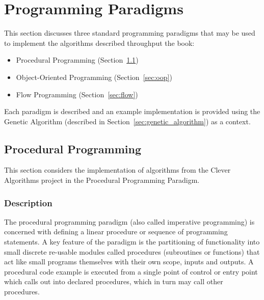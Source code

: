 
\section{Programming Paradigms} 
\label{advanced:sec:paradigms}

This section discusses three standard programming paradigms that may be used to implement the algorithms described throughput the book:

\begin{itemize}
	\item Procedural Programming (Section~\ref{sec:procedural})
	\item Object-Oriented Programming (Section~\ref{sec:oop})
	\item Flow Programming (Section~\ref{sec:flow})
\end{itemize}

Each paradigm is described and an example implementation is provided using the Genetic Algorithm (described in Section~\ref{sec:genetic_algorithm}) as a context.

% 
% 
\subsection{Procedural Programming}
\label{sec:procedural}
This section considers the implementation of algorithms from the Clever Algorithms project in the Procedural Programming Paradigm.

\subsubsection{Description}
The procedural programming paradigm (also called imperative programming) is concerned with defining a linear procedure or sequence of programming statements. A key feature of the paradigm is the partitioning of functionality into small discrete re-usable modules called procedures (subroutines or functions) that act like small programs themselves with their own scope, inputs and outputs. A procedural code example is executed from a single point of control or entry point which calls out into declared procedures, which in turn may call other procedures.

